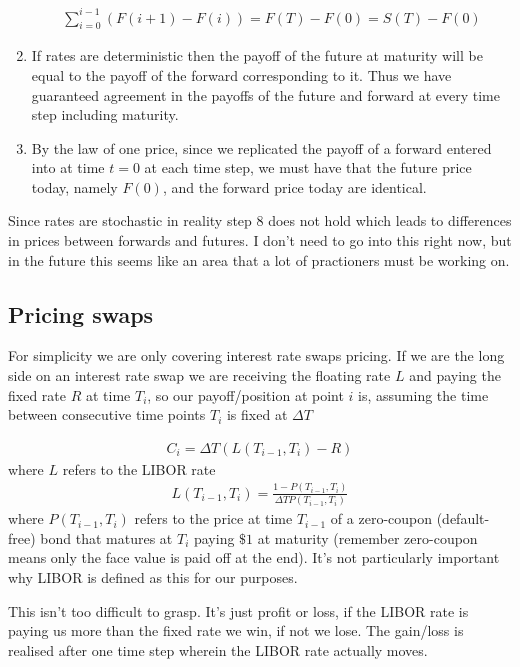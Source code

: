 \documentclass[9pt]{extarticle}
\begin{document}
\begin{enumerate}
\begin{align}
  \sum_{i=0}^{i-1} (F(i+1)- F(i)) = F(T) - F(0) = S(T) - F(0)
\end{align}
\item If rates are deterministic then the payoff of the future at maturity will be equal to the payoff of the forward corresponding to it. Thus 
we have guaranteed agreement in the payoffs of the future and forward at every time step including maturity. 
\item By the law of one price, since we replicated the payoff of a forward entered into at time $t=0$ at each time step, we must have that the future 
price today, namely $F(0)$, and the forward price today are identical. 
\end{enumerate}

Since rates are stochastic in reality step 8 does not hold which leads to differences in prices between forwards and futures. I don't need 
to go into this right now, but in the future this seems like an area that a lot of practioners must be working on. 

\subsection{Pricing swaps}

For simplicity we are only covering interest rate swaps pricing. If we are the long side on an interest rate swap we are receiving the floating rate 
$L$ and paying the fixed rate $R$ at time $T_i$, so our payoff/position at point 
$i$ is, assuming the time between consecutive time points $T_i$ is fixed at $\Delta T$ 
 
\begin{align}\label{swp}
  C_i = \Delta T (L(T_{i-1},T_i) - R)
\end{align}
where $L$ refers to the LIBOR rate
\begin{align}\label{lr}
L(T_{i-1}, T_i) = \frac{1-P(T_{i-1}, T_i)}{\Delta T P(T_{i-1},T_i)}
\end{align}
where $P(T_{i-1},T_i)$ refers to the price at time $T_{i-1}$ of a zero-coupon (default-free) bond that matures at $T_i$ paying 
$\$1$ at maturity (remember zero-coupon means only the face value is paid off at the end). It's not particularly 
important why LIBOR is defined as this for our purposes.


This isn't too difficult to grasp. It's just profit or loss, if the LIBOR rate is paying us more than 
the fixed rate we win, if  not we lose. The gain/loss is realised after one time step wherein the LIBOR 
rate actually moves.
\end{document}

